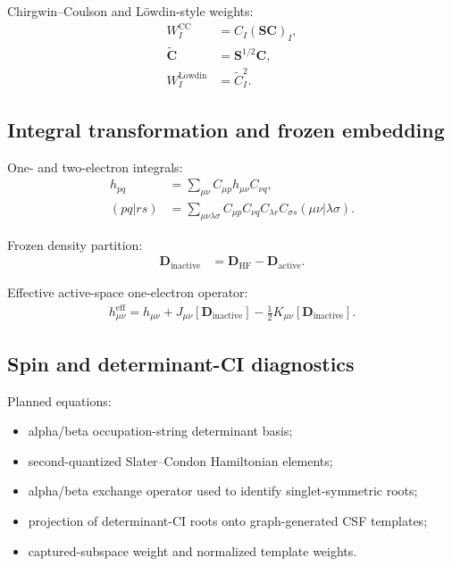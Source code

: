 \documentclass[11pt]{article}
\newcommand{\dens}{\mathbf{D}}
\newcommand{\overlap}{\mathbf{S}}
\begin{document}
Chirgwin--Coulson and L\"owdin-style weights:
\begin{equation}
\begin{aligned}
	W_I^{\mathrm{CC}} &= C_I (\overlap \mathbf{C})_I, \\
	\widetilde{\mathbf{C}} &= \overlap^{1/2}\mathbf{C}, \\
	W_I^{\mathrm{L\ddot{o}wdin}} &= \widetilde{C}_I^2.
\end{aligned}
\end{equation}

\subsection{Integral transformation and frozen embedding}
One- and two-electron integrals:
\begin{equation}
\begin{aligned}
	h_{pq} &= \sum_{\mu\nu} C_{\mu p} h_{\mu\nu} C_{\nu q}, \\
	(pq|rs) &= \sum_{\mu\nu\lambda\sigma}
	C_{\mu p} C_{\nu q} C_{\lambda r} C_{\sigma s}
	(\mu\nu|\lambda\sigma).
\end{aligned}
\end{equation}

Frozen density partition:
\begin{equation}
\begin{aligned}
	\dens_{\mathrm{inactive}} &= \dens_{\mathrm{HF}} - \dens_{\mathrm{active}}.
\end{aligned}
\end{equation}

Effective active-space one-electron operator:
\begin{equation}
\begin{aligned}
	h^{\mathrm{eff}}_{\mu\nu}
	= h_{\mu\nu} + J_{\mu\nu}[\dens_{\mathrm{inactive}}]
	- \frac{1}{2}K_{\mu\nu}[\dens_{\mathrm{inactive}}].
\end{aligned}
\end{equation}

\subsection{Spin and determinant-CI diagnostics}
Planned equations:
\begin{itemize}[leftmargin=*]
	\item alpha/beta occupation-string determinant basis;
	\item second-quantized Slater--Condon Hamiltonian elements;
	\item alpha/beta exchange operator used to identify singlet-symmetric roots;
	\item projection of determinant-CI roots onto graph-generated CSF templates;
	\item captured-subspace weight and normalized template weights.
\end{itemize}
\end{document}
